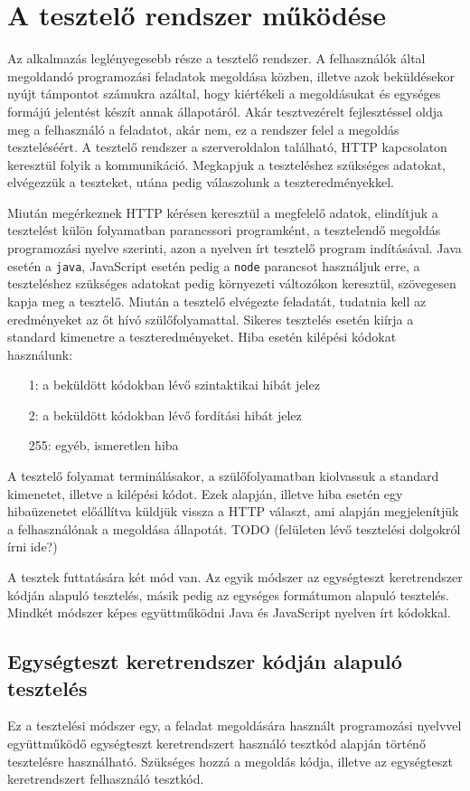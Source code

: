 \documentclass{elteikthesis}
\begin{document}
		\section{A tesztelő rendszer működése}
			Az alkalmazás leglényegesebb része a tesztelő rendszer. A felhasználók által megoldandó programozási feladatok megoldása közben, illetve azok beküldésekor nyújt támpontot számukra azáltal, hogy kiértékeli a megoldásukat és egységes formájú jelentést készít annak állapotáról. Akár tesztvezérelt fejlesztéssel oldja meg a felhasználó a feladatot, akár nem, ez a rendszer felel a megoldás teszteléséért. A tesztelő rendszer a szerveroldalon található, HTTP kapcsolaton keresztül folyik a kommunikáció. Megkapjuk a teszteléshez szükséges adatokat, elvégezzük a teszteket, utána pedig válaszolunk a teszteredményekkel.
			
			Miután megérkeznek HTTP kérésen keresztül a megfelelő adatok, elindítjuk a tesztelést külön folyamatban parancssori programként, a tesztelendő megoldás programozási nyelve szerinti, azon a nyelven írt tesztelő program indításával. Java esetén a \texttt{java}, JavaScript esetén pedig a \texttt{node} parancsot használjuk erre, a teszteléshez szükséges adatokat pedig környezeti változókon keresztül, szövegesen kapja meg a tesztelő. Miután a tesztelő elvégezte feladatát, tudatnia kell az eredményeket az őt hívó szülőfolyamattal. Sikeres tesztelés esetén kiírja a standard kimenetre a teszteredményeket. Hiba esetén kilépési kódokat használunk:
			\begin{itemize}
				\setlength\itemsep{-0.5em}
				\item[1:] a beküldött kódokban lévő szintaktikai hibát jelez
				\item[2:] a beküldött kódokban lévő fordítási hibát jelez
				\item[255:] egyéb, ismeretlen hiba
			\end{itemize}
			A tesztelő folyamat terminálásakor, a szülőfolyamatban kiolvassuk a standard kimenetet, illetve a kilépési kódot. Ezek alapján, illetve hiba esetén egy hibaüzenetet előállítva küldjük vissza a HTTP választ, ami alapján megjelenítjük a felhasználónak a megoldása állapotát. TODO (felületen lévő tesztelési dolgokról írni ide?)
		
			A tesztek futtatására két mód van. Az egyik módszer az egységteszt keretrendszer kódján alapuló tesztelés, másik pedig az egységes formátumon alapuló tesztelés. Mindkét módszer képes együttműködni Java és JavaScript nyelven írt kódokkal.

			\subsection{Egységteszt keretrendszer kódján alapuló tesztelés}
				Ez a tesztelési módszer egy, a feladat megoldására használt programozási nyelvvel együttműködő egységteszt keretrendszert használó tesztkód alapján történő tesztelésre használható. Szükséges hozzá a megoldás kódja, illetve az egységteszt keretrendszert felhasználó tesztkód.
				
\end{document}

